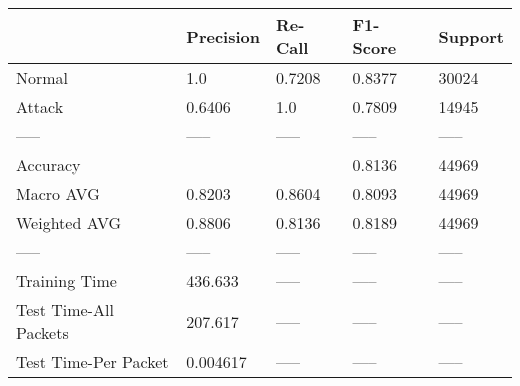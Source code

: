 \begin{tabular}{lllll}
\toprule
{} & Precision & Re-Call & F1-Score & Support \\
\midrule
Normal                &       1.0 &  0.7208 &   0.8377 &   30024 \\
Attack                &    0.6406 &     1.0 &   0.7809 &   14945 \\
-----                 &     ----- &   ----- &    ----- &   ----- \\
Accuracy              &           &         &   0.8136 &   44969 \\
Macro AVG             &    0.8203 &  0.8604 &   0.8093 &   44969 \\
Weighted AVG          &    0.8806 &  0.8136 &   0.8189 &   44969 \\
-----                 &     ----- &   ----- &    ----- &   ----- \\
Training Time         &   436.633 &   ----- &    ----- &   ----- \\
Test Time-All Packets &   207.617 &   ----- &    ----- &   ----- \\
Test Time-Per Packet  &  0.004617 &   ----- &    ----- &   ----- \\
\bottomrule
\end{tabular}
